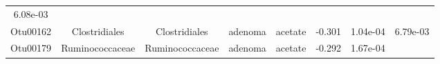 \documentclass[11pt,]{article}
\begin{document}
\begin{longtable}[]{@{}cccccccc@{}}
\begin{minipage}[t]{0.08\columnwidth}
6.08e-03\strut
\end{minipage}\tabularnewline
\begin{minipage}[t]{0.08\columnwidth}\centering\strut
Otu00162\strut
\end{minipage} & \begin{minipage}[t]{0.15\columnwidth}\centering\strut
Clostridiales\strut
\end{minipage} & \begin{minipage}[t]{0.15\columnwidth}\centering\strut
Clostridiales\strut
\end{minipage} & \begin{minipage}[t]{0.08\columnwidth}\centering\strut
adenoma\strut
\end{minipage} & \begin{minipage}[t]{0.09\columnwidth}\centering\strut
acetate\strut
\end{minipage} & \begin{minipage}[t]{0.07\columnwidth}\centering\strut
-0.301\strut
\end{minipage} & \begin{minipage}[t]{0.08\columnwidth}\centering\strut
1.04e-04\strut
\end{minipage} & \begin{minipage}[t]{0.08\columnwidth}\centering\strut
6.79e-03\strut
\end{minipage}\tabularnewline
\begin{minipage}[t]{0.08\columnwidth}\centering\strut
Otu00179\strut
\end{minipage} & \begin{minipage}[t]{0.15\columnwidth}\centering\strut
Ruminococcaceae\strut
\end{minipage} & \begin{minipage}[t]{0.15\columnwidth}\centering\strut
Ruminococcaceae\strut
\end{minipage} & \begin{minipage}[t]{0.08\columnwidth}\centering\strut
adenoma\strut
\end{minipage} & \begin{minipage}[t]{0.09\columnwidth}\centering\strut
acetate\strut
\end{minipage} & \begin{minipage}[t]{0.07\columnwidth}\centering\strut
-0.292\strut
\end{minipage} & \begin{minipage}[t]{0.08\columnwidth}\centering\strut
1.67e-04\strut
\end{minipage} & \begin{minipage}[t]{0.08\columnwidth}\centering\strut

\end{minipage}
\end{longtable}
\end{document}
